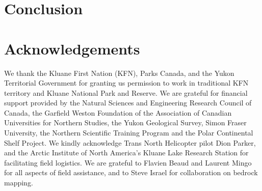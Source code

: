 \documentclass[review]{igs}
\begin{document}
%
%
%




\section{Conclusion}

\section{Acknowledgements}
We thank the Kluane First Nation (KFN), Parks Canada, and the Yukon Territorial Government for granting us permission to work in traditional KFN territory and Kluane National Park and Reserve. We are grateful for financial support provided by the Natural Sciences and Engineering Research Council of Canada, the Garfield Weston Foundation of the Association of Canadian Universities for Northern Studies, the Yukon Geological Survey, Simon Fraser University, the Northern Scientific Training Program and the Polar Continental Shelf Project. We kindly acknowledge Trans North Helicopter pilot Dion Parker, and the Arctic Institute of North America's Kluane Lake Research Station for facilitating field logistics. We are grateful to Flavien Beaud and Laurent Mingo for all aspects of field assistance, and to Steve Israel for collaboration on bedrock mapping. 
\end{document}
